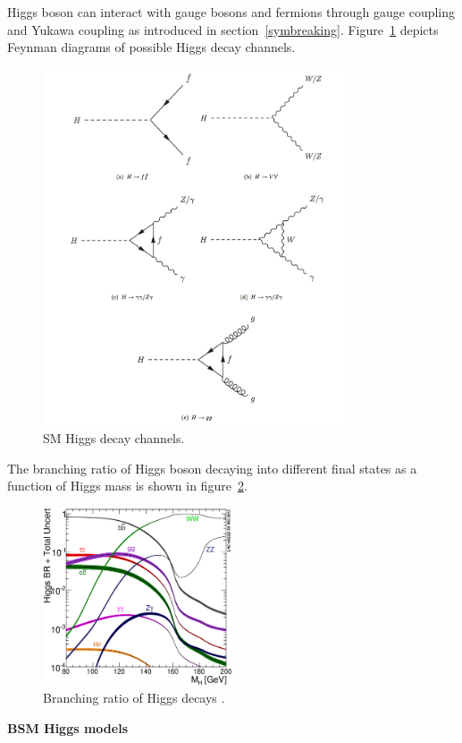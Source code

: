 Higgs boson can interact with gauge bosons and fermions through gauge coupling and Yukawa coupling as introduced in section~\ref{symbreaking}.
Figure~\ref{fig:higgs_decay_fd} depicts Feynman diagrams of possible Higgs decay channels.
\begin{figure}[!htb]
  \centering
  \includegraphics[width=0.8\textwidth]{figures/Theory/Figures_Feynman_Hdecay.png}
  \caption{SM Higgs decay channels.}
  \label{fig:higgs_decay_fd}
\end{figure}
The branching ratio of Higgs boson decaying into different final states as a function of Higgs mass is shown in figure~\ref{fig:higgs_decay_br}.
\begin{figure}[!htb]
  \centering
  \includegraphics[width=0.5\textwidth]{figures/Theory/Higgs_BR_LM.eps}
  \caption{Branching ratio of Higgs decays \cite{Heinemeyer:1559921}. }
  \label{fig:higgs_decay_br}
\end{figure} 

\textbf{BSM Higgs models} 


